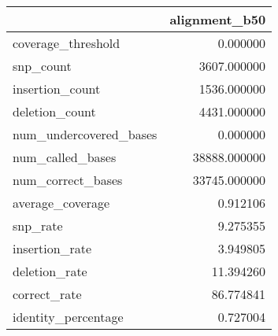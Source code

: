 \begin{tabular}{lr}
\toprule
{} &  alignment\_b50 \\
\midrule
coverage\_threshold     &       0.000000 \\
snp\_count              &    3607.000000 \\
insertion\_count        &    1536.000000 \\
deletion\_count         &    4431.000000 \\
num\_undercovered\_bases &       0.000000 \\
num\_called\_bases       &   38888.000000 \\
num\_correct\_bases      &   33745.000000 \\
average\_coverage       &       0.912106 \\
snp\_rate               &       9.275355 \\
insertion\_rate         &       3.949805 \\
deletion\_rate          &      11.394260 \\
correct\_rate           &      86.774841 \\
identity\_percentage    &       0.727004 \\
\bottomrule
\end{tabular}
